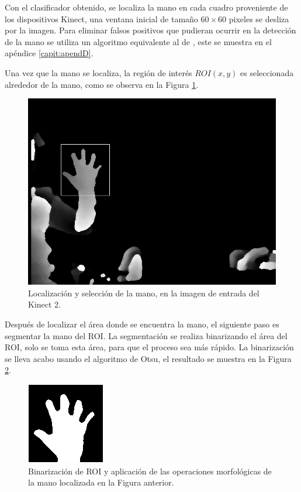Con el clasificador obtenido, se localiza la mano en cada cuadro proveniente de los dispositivos  Kinect, una ventana  inicial de tamaño $60 \times 60$ pixeles se desliza por la imagen. Para eliminar falsos positivos que pudieran ocurrir en la detección de la mano se utiliza un algoritmo equivalente al de \cite{Mei2015}, este se muestra en el apéndice \ref{capit:apendD}.

Una vez que la mano se localiza, la región de interés $ROI(x,y)$ es seleccionada alrededor de la mano, como se observa en la Figura \ref{fig:Roi}.

\begin{figure}[h!]
\begin{center}
\includegraphics[scale=.35]{./Figures/DS_252.png}
\end{center}
\caption{Localización y selección de la mano, en la imagen de entrada del Kinect 2.}
\label{fig:Roi}
\end{figure}  

Después de localizar el área donde se encuentra la mano, el siguiente paso es segmentar la mano del ROI. La segmentación se realiza binarizando el área del ROI, solo se toma esta área, para que el proceso sea más rápido. La binarizaci\'on se lleva acabo usando el algoritmo de Otsu, el resultado se muestra en la Figura \ref{fig:BinarizationRoi}. 
  
\begin{figure}[h!]
\begin{center}
\includegraphics[scale=1]{./Figures/250B_Otsu.png}
\end{center}
\caption{Binarización de ROI y aplicación de las operaciones morfológicas de la mano localizada en la Figura anterior.}
\label{fig:BinarizationRoi}
\end{figure} 

